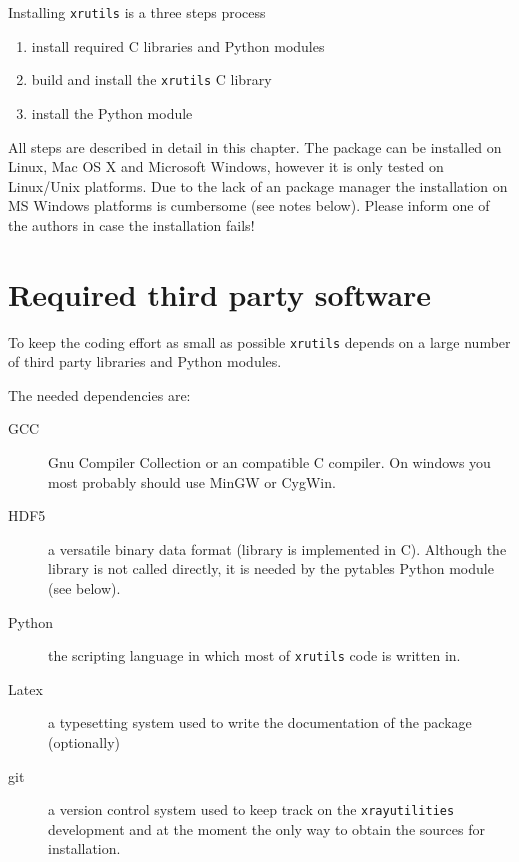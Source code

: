 %
%
%
%


Installing {\tt xrutils} is a three steps process
\begin{enumerate}
\item install required C libraries and Python modules
\item build and install the {\tt xrutils} C library
\item install the Python module
\end{enumerate}
All steps are described in detail in this chapter. The package can be installed on Linux, Mac OS X and Microsoft Windows, however it is only tested on Linux/Unix platforms. Due to the lack of an package manager the installation on MS Windows platforms is cumbersome (see notes below). Please inform one of the authors in case the installation fails!

\section{Required third party software}
To keep the coding effort as small as possible {\tt xrutils} depends on a 
large number of third party libraries and Python modules. 

The needed dependencies are: 
\begin{description}
\item[GCC] Gnu Compiler Collection or an compatible C compiler. On windows you most probably should use MinGW or CygWin.
\item[HDF5] a versatile binary data format (library is implemented in C).
Although the library is not called directly, it is needed by the pytables Python
module (see below).
\item[Python] the scripting language in which most of {\tt xrutils} code is written in.
\item[Latex] a typesetting system used to write the documentation of the package (optionally)
\item[git] a version control system used to keep track on the {\tt xrayutilities} development and at the moment the only way to obtain the sources for installation.
\end{description}

